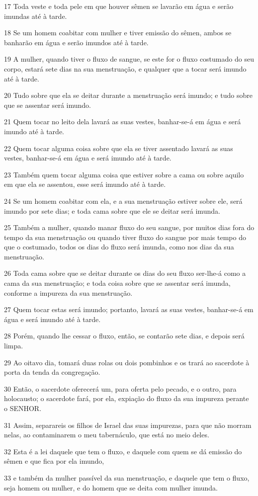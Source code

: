 \par 17 Toda veste e toda pele em que houver sêmen se lavarão em água e serão imundas até à tarde.
\par 18 Se um homem coabitar com mulher e tiver emissão do sêmen, ambos se banharão em água e serão imundos até à tarde.
\par 19 A mulher, quando tiver o fluxo de sangue, se este for o fluxo costumado do seu corpo, estará sete dias na sua menstruação, e qualquer que a tocar será imundo até à tarde.
\par 20 Tudo sobre que ela se deitar durante a menstruação será imundo; e tudo sobre que se assentar será imundo.
\par 21 Quem tocar no leito dela lavará as suas vestes, banhar-se-á em água e será imundo até à tarde.
\par 22 Quem tocar alguma coisa sobre que ela se tiver assentado lavará as suas vestes, banhar-se-á em água e será imundo até à tarde.
\par 23 Também quem tocar alguma coisa que estiver sobre a cama ou sobre aquilo em que ela se assentou, esse será imundo até à tarde.
\par 24 Se um homem coabitar com ela, e a sua menstruação estiver sobre ele, será imundo por sete dias; e toda cama sobre que ele se deitar será imunda.
\par 25 Também a mulher, quando manar fluxo do seu sangue, por muitos dias fora do tempo da sua menstruação ou quando tiver fluxo do sangue por mais tempo do que o costumado, todos os dias do fluxo será imunda, como nos dias da sua menstruação.
\par 26 Toda cama sobre que se deitar durante os dias do seu fluxo ser-lhe-á como a cama da sua menstruação; e toda coisa sobre que se assentar será imunda, conforme a impureza da sua menstruação.
\par 27 Quem tocar estas será imundo; portanto, lavará as suas vestes, banhar-se-á em água e será imundo até à tarde.
\par 28 Porém, quando lhe cessar o fluxo, então, se contarão sete dias, e depois será limpa.
\par 29 Ao oitavo dia, tomará duas rolas ou dois pombinhos e os trará ao sacerdote à porta da tenda da congregação.
\par 30 Então, o sacerdote oferecerá um, para oferta pelo pecado, e o outro, para holocausto; o sacerdote fará, por ela, expiação do fluxo da sua impureza perante o SENHOR.
\par 31 Assim, separareis os filhos de Israel das suas impurezas, para que não morram nelas, ao contaminarem o meu tabernáculo, que está no meio deles.
\par 32 Esta é a lei daquele que tem o fluxo, e daquele com quem se dá emissão do sêmen e que fica por ela imundo,
\par 33 e também da mulher passível da sua menstruação, e daquele que tem o fluxo, seja homem ou mulher, e do homem que se deita com mulher imunda.

